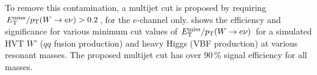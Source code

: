 \clearpage
To remove this contamination, a multijet cut is proposed by requiring $E_{\text{T}}^{\text{miss}}/p_{\text{T}}(W\rightarrow e\nu)>0.2$, for the $e$-channel only. \Fig{\ref{fig:metpt_eff}} shows the efficiency and significance for various minimum cut values of $E_{\text{T}}^{\text{miss}}/p_{\text{T}}(W\rightarrow e\nu)$ for a simulated HVT $W$' ($qq$ fusion production) and heavy Higgs (VBF production) at various resonant masses. The proposed multijet cut has over 90\,\% signal efficiency for all masses.
\begin{figure}[htb]
\centering
{}
\\

\end{figure}
